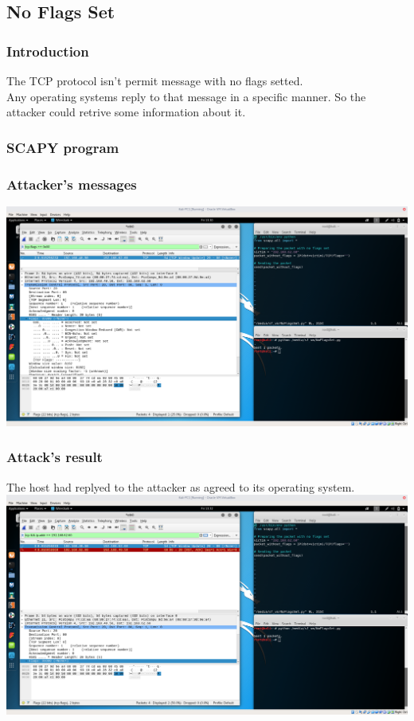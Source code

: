 \subsection{No Flags Set}
\subsubsection{Introduction}
The TCP protocol isn't permit message with no flags setted.\\
Any operating systems reply to that message in a specific manner. So the attacker could retrive some information about it.\par

\subsubsection{SCAPY program}


\subsubsection{Attacker's messages}
\includegraphics[width=16cm]{img/NoFlagsSetAttackerMessage.png}\par

\subsubsection{Attack's result}
The host had replyed to the attacker as agreed to its operating system.\\
\includegraphics[width=16cm]{img/NoFlagsSetResult.png}\par



